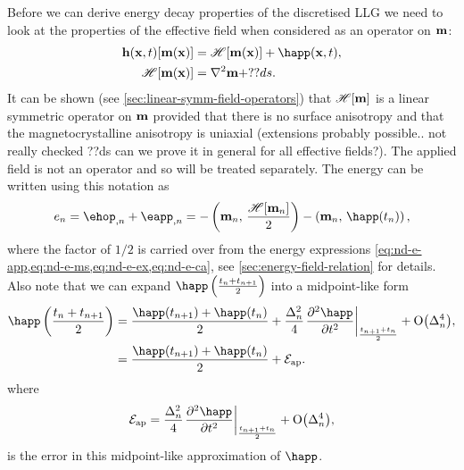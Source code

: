 Before we can derive energy decay properties of the discretised LLG we need to look at the properties of the effective field when considered as an operator on $\mathbf{m}$:
\begin{equation}
  \begin{aligned}
    \label{eq:hop}
    \hv(\xv, t)[\mv(\xv)] &= \hop [\mv(\xv)] + \happ(\xv, t), \\
    \hop [\mv(\xv)] &= \lap \mv + ??ds.\\
  \end{aligned}
\end{equation}
It can be shown (see \cref{sec:linear-symm-field-operators}) that $\mathscr{H}[\mathbf{m}]$ is a linear symmetric operator on $\mathbf{m}$ provided that there is no surface anisotropy and that the magnetocrystalline anisotropy is uniaxial (extensions probably possible.. not really checked ??ds can we prove it in general for all effective fields?).
The applied field is not an operator and so will be treated separately.
The energy can be written using this notation as
\begin{equation}
  \label{eq:energy-hop}
  \e_n = \ehop_{,n} + \eapp_{,n} = - \ip{\mv_n}{\frac{\hop[\mv_n]}{2}} - \ip{\mv_n}{\happ(t_n)},
\end{equation}
where the factor of $1/2$ is carried over from the energy expressions \cref{eq:nd-e-app,eq:nd-e-ms,eq:nd-e-ex,eq:nd-e-ca}, see \cref{sec:energy-field-relation} for details.
Also note that we can expand $\mphapp$ into a midpoint-like form
\begin{equation}
  \begin{aligned}
  \mphapp &= \frac{\happ(t_{n+1}) + \happ(t_n)}{2} 
  + \frac{\dtn^2}{4} \evalatb{\spd{\happ}{t}}{\frac{t_{n+1} + t_n}{2}}  + \order{\dtn^4}, \\
  &= \frac{\happ(t_{n+1}) + \happ(t_n)}{2} + \happerror.\\
  \label{eq:happ-midpoint}
\end{aligned}
\end{equation}
where
\begin{equation}
  \happerror = \frac{\dtn^2}{4} \evalatb{\spd{\happ}{t}}{\frac{t_{n+1} + t_n}{2}}  + \order{\dtn^4},
\end{equation}
is the error in this midpoint-like approximation of $\happ$.

